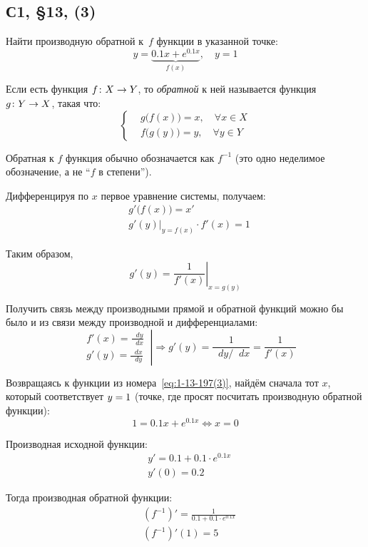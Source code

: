\documentclass[a4paper,12pt]{article}
\newcommand{\diff}{\mathop{}\!d\!}
\begin{document}
  \subsection{С1, \S 13, (3)}

  Найти производную обратной к~$f$ функции в указанной точке:
  \begin{equation}\label{eq:1-13-197(3)}
    y = \underbrace{0{.}1x + e^{0{.}1 x}}_{f(x)},\quad y = 1
  \end{equation}

  \begin{solution}

    Если есть функция $f\colon X \hm\to Y$, то \emph{обратной} к ней называется функция $g\colon Y \hm\to X$, такая что:
    \[
      \left\{
        \begin{aligned}
          &g\bigl(f(x)\bigr) = x,\quad \forall x \in X\\
          &f\bigl(g(y)\bigr) = y,\quad \forall y \in Y
        \end{aligned}
      \right.
    \]

    Обратная к $f$ функция обычно обозначается как $f^{-1}$ (это одно неделимое обозначение, а не ``$f$ в степени'').

    Дифференцируя по $x$ первое уравнение системы, получаем:
    \[
      \begin{aligned}
        &g'\bigl(f(x)\bigr) = x'\\
        &g'(y)|_{y = f(x)} \cdot f'(x) = 1
      \end{aligned}
    \]

    Таким образом,
    \[
      \boxed{g'(y) = \left.\frac{1}{f'(x)}\right|_{x = g(y)}}
    \]

    Получить связь между производными прямой и обратной функций можно бы было и из связи между производной и дифференциалами:
    \[
      \left.\begin{aligned}
        &f'(x) = \frac{\diff y}{\diff x}\\
        &g'(y) = \frac{\diff x}{\diff y}
      \end{aligned}\ \right|
      \Rightarrow g'(y) = \frac{1}{\diff y /\!\diff x}
        = \frac{1}{f'(x)}
    \]

    Возвращаясь к функции из номера~\eqref{eq:1-13-197(3)}, найдём сначала тот $x$, который соответствует $y \hm= 1$ (точке, где просят посчитать производную обратной функции):
    \[
      1 = 0{.}1x + e^{0{.}1 x} \Leftrightarrow x = 0
    \]

    Производная исходной функции:
    \[
      \begin{aligned}
        &y' = 0{.}1 + 0{.}1 \cdot e^{0{.}1 x}\\
        &y'(0) = 0{.}2
      \end{aligned}
    \]

    Тогда производная обратной функции:
    \[
      \begin{aligned}
        &(f^{-1})' = \frac{1}{0{.}1 + 0{.}1 \cdot e^{0{.}1 x}}\\
        &(f^{-1})'(1) = 5
      \end{aligned}
    \]
  \end{solution}
\end{document}
